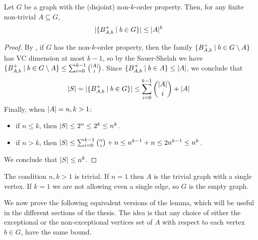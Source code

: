         \begin{lemma} \label{lem:k_order_property_bounds_BAbs}
            Let $G$ be a graph with the (disjoint) non-$k$-order property.
            Then, for any finite non-trivial $A \subseteq G$,
            \[
                | \{ B^+_{A,b} \mid b \in G \} | \leq |A|^k
            \]
            \begin{proof}
                By , if $G$ has the non-$k$-order property,
                then the family $\{ B^+_{A,b} \mid b \in G \setminus A \}$ has VC dimension at most $k-1$,
                so by the Sauer-Shelah  we have
                $\{ B^+_{A,b} \mid b \in G \setminus A \} \leq \sum_{i=0}^{k-1} \binom{|A|}{i}$.
                Since $\{ B^+_{A,b} \mid b \in A \} \leq | A |$, we conclude that
                \[
                    | S | = | \{ B^+_{A,b} \mid b \in G \} | \leq \sum_{i=0}^{k-1} \binom{|A|}{i} + |A|
                \]
                Finally, when $| A | = n,k > 1$: 
                \begin{itemize}
                    \item if $n \leq k$, then $| S | \leq 2^n \leq 2^k \leq n^k$.
                    \item if $n > k$, then $| S | \leq \sum_{i=0}^{k-1} {n \choose i} + n \leq n^{k-1} + n \leq 2n^{k-1} \leq n^k$.
                \end{itemize}
                We conclude that $| S | \leq n^k$.
            \end{proof}
        \end{lemma}

        \begin{remark}
            The condition $n,k > 1$ is trivial.
            If $n=1$ then $A$ is the trivial graph with a single vertex.
            If $k=1$ we are not allowing even a single edge, so $G$ is the empty graph.
        \end{remark}

        We now prove the following equivalent versions of the lemma, which will be useful in the different sections of the
        thesis.
        The idea is that any choice of either the exceptional or the non-exceptional vertices set of $A$ with respect to
        each vertex $b \in G$, have the same bound.

